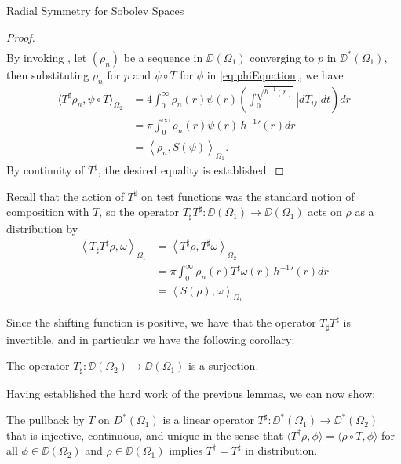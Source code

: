 \begin{chapter}{Radial Symmetry for Sobolev Spaces}
\begin{proof}
\begin{align}
  \end{align}
  By invoking , let $(\rho_n)$ be a sequence in $\DD(\Omega_1)$ converging to $p$ in $\DD^*(\Omega_1)$, then substituting $\rho_n$ for $p$ and $\psi \circ T$ for $\phi$ in \eqref{eq:phiEquation}, we have
  \begin{align}
    \langle T^\sharp \rho_n, \psi \circ T \rangle_{\Omega_2}  &= 4\int_0^\infty \rho_n(r) \psi(r)  \left(\int_0^{\sqrt{h^{-1}(r)}} \left|dT_{ij}\right| dt\right) dr \nonumber \\
      &= \pi \int_0^\infty \rho_n(r) \psi(r)\,{h^{-1}}'(r) dr \nonumber\\
      &= \left\langle \rho_n, S(\psi) \right\rangle_{\Omega_1}. \label{eq:pullbackInnerProd}
  \end{align}
  By continuity of $T^\sharp$, the desired equality is established.
\end{proof}

Recall that the action of $T^\sharp$ on test functions was the standard notion of composition with $T$, so the operator $T_{\sharp}T^\sharp :\DD(\Omega_1)\to \DD(\Omega_1)$ acts on $\rho$ as a distribution by
\begin{align}
  \left\langle T_{\sharp} T^\sharp \rho, \omega \right \rangle_{\Omega_1} 
  &= \left\langle T^\sharp \rho, T^{\sharp} \omega \right \rangle_{\Omega_2} \nonumber \\
  &= \pi \int_0^\infty \rho_n(r) T^{\sharp}\omega(r)\,{h^{-1}}'(r) dr \nonumber\\
  &= \left\langle S(\rho), \omega \right \rangle_{\Omega_1}
\end{align}

Since the shifting function is positive, we have that the operator $T_\sharp T^{\sharp}$ is invertible, and in particular we have the following corollary:
\begin{cor} \label{cor:surjectiveTsharp}
  The operator $T_{\sharp}:\DD(\Omega_2)\to\DD(\Omega_1)$ is a surjection.
\end{cor}

Having established the hard work of the previous lemmas, we can now show:
\begin{thm} \label{thm:pullback}
  The pullback by $T$ on $D^*(\Omega_1)$ is a linear operator $T^\sharp:\DD^*(\Omega_1) \to \DD^*(\Omega_2)$ that is injective, continuous, and unique in the sense that $\langle T^\dagger \rho ,\phi\rangle = \langle \rho \circ T,\phi\rangle$ for all $\phi \in \DD(\Omega_2)$ and $\rho \in \DD(\Omega_1)$ implies $T^\dagger = T^\sharp$ in distribution.


\end{thm}
\end{chapter}
